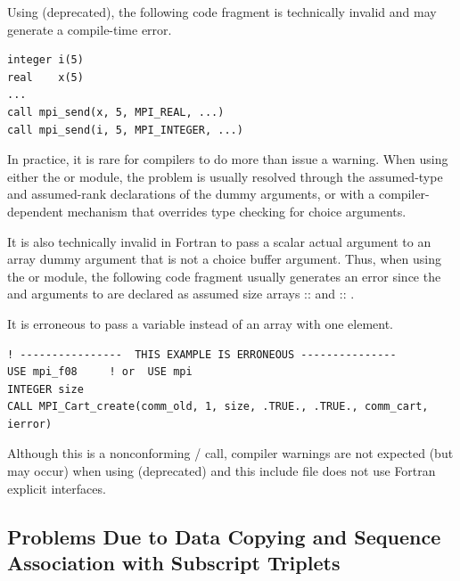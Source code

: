 Using  (deprecated), the following code fragment
is technically invalid and may
generate a compile-time error.
\begin{lstlisting}[language={[MPI]Fortran}]
integer i(5)
real    x(5)
...
call mpi_send(x, 5, MPI_REAL, ...)
call mpi_send(i, 5, MPI_INTEGER, ...)
\end{lstlisting}
In practice, it is rare for compilers to do more than issue a
warning.
When using either the  or  module, the problem is usually resolved through
the assumed-type and assumed-rank declarations of the dummy arguments,
or with a compiler-dependent mechanism that overrides type checking for choice arguments.

It is also technically invalid in Fortran to pass a scalar actual
argument to an array dummy argument that is not a choice buffer argument.
Thus, when using the  or  module,
the following code fragment usually generates an error since
the   and   arguments to
 are declared as assumed size arrays  ::  and  :: .

\begin{example}
It is erroneous to pass a variable instead of an array with one element.
\label{exa:lang:scalar:vs:array}
%
\begin{lstlisting}[language={[MPI08]Fortran},basicstyle=\lstsmall]
! ----------------  THIS EXAMPLE IS ERRONEOUS ---------------
USE mpi_f08     ! or  USE mpi
INTEGER size
CALL MPI_Cart_create(comm_old, 1, size, .TRUE., .TRUE., comm_cart, ierror)
\end{lstlisting}
\end{example}
Although this is a nonconforming \MPI/ call,
compiler warnings are not expected (but may occur)
when using  (deprecated)
and this include file does not use Fortran explicit interfaces.

\subsection{Problems Due to Data Copying and Sequence Association with Subscript Triplets}
\label{sec:misc-sequence}
%

